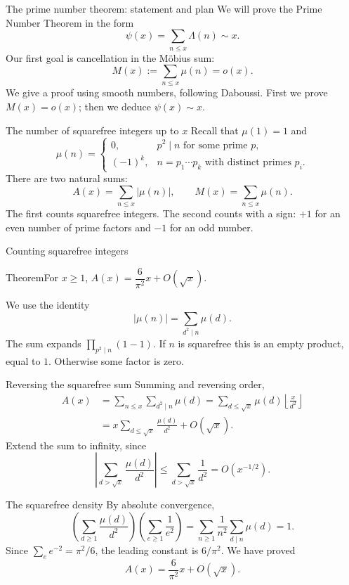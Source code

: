 \documentclass[aspectratio=169,11pt]{beamer}
\begin{document}
\begin{frame}{The prime number theorem: statement and plan}
We will prove the Prime Number Theorem in the form
\[\psi(x)=\sum_{n\le x}\Lambda(n)\sim x.\]
Our first goal is cancellation in the M\"obius sum:
\[M(x):=\sum_{n\le x}\mu(n)=o(x).\]
We give a proof using smooth numbers, following Daboussi. First we prove $M(x)=o(x)$; then we deduce $\psi(x)\sim x$.
\end{frame}
\begin{frame}{The number of squarefree integers up to $x$}
Recall that $\mu(1)=1$ and
\[\mu(n)=\begin{cases}0,&p^2\mid n\text{ for some prime }p,\\(-1)^k,&n=p_1\cdots p_k\text{ with distinct primes }p_i.\end{cases}\]
There are two natural sums:
\[A(x)=\sum_{n\le x}|\mu(n)|,\qquad M(x)=\sum_{n\le x}\mu(n).\]
The first counts squarefree integers. The second counts with a sign: $+1$ for an even number of prime factors and $-1$ for an odd number.
\end{frame}
\begin{frame}{Counting squarefree integers}
\begin{block}{Theorem}For $x\ge1$, $A(x)=\dfrac6{\pi^2}x+O(\sqrt x)$.\end{block}
We use the identity
\[|\mu(n)|=\sum_{d^2\mid n}\mu(d).\]
The sum expands $\prod_{p^2\mid n}(1-1)$. If $n$ is squarefree this is an empty product, equal to $1$. Otherwise some factor is zero.
\end{frame}
\begin{frame}{Reversing the squarefree sum}
Summing and reversing order,
\begin{align*}
A(x)&=\sum_{n\le x}\sum_{d^2\mid n}\mu(d)
=\sum_{d\le\sqrt x}\mu(d)\left\lfloor\frac{x}{d^2}\right\rfloor\\
&=x\sum_{d\le\sqrt x}\frac{\mu(d)}{d^2}+O(\sqrt x).
\end{align*}
Extend the sum to infinity, since
\[\left|\sum_{d>\sqrt x}\frac{\mu(d)}{d^2}\right|\le\sum_{d>\sqrt x}\frac1{d^2}=O(x^{-1/2}).\]
\end{frame}
\begin{frame}{The squarefree density}
By absolute convergence,
\[\left(\sum_{d\ge1}\frac{\mu(d)}{d^2}\right)\left(\sum_{e\ge1}\frac1{e^2}\right)
=\sum_{n\ge1}\frac1{n^2}\sum_{d\mid n}\mu(d)=1.\]
Since $\sum_e e^{-2}=\pi^2/6$, the leading constant is $6/\pi^2$. We have proved
\[A(x)=\frac6{\pi^2}x+O(\sqrt x).\]
\end{frame}
\end{document}

